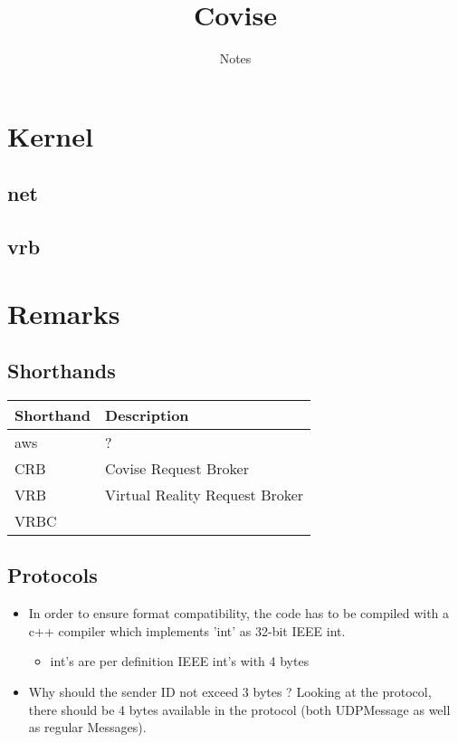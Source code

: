 \documentclass[12pt,pdftex,a4paper]{scrbook}
\newcommand{\shandentry}[2]{\label{intern::shorthands::#1} #1 & #2 \\ \hline}
\begin{document}
	\thispagestyle{empty}
	\title{Covise}
	\subtitle{Notes}
	\author{}
	\maketitle
	
	\newpage
	\tableofcontents

	\part{Kernel}
	
	\chapter{net}
	
	
	
	\chapter{vrb}

	

	\part{Remarks}

	\chapter{Shorthands}
	
	\begin{tabular}{||p{4cm}|p{10cm}||}
		\hline
		\textbf{Shorthand} & \textbf{Description}\\
		\hline
		\hline
		\shandentry{aws}{?}
		\shandentry{CRB}{Covise Request Broker}
		\shandentry{VRB}{Virtual Reality Request Broker}
		\shandentry{VRBC}{}
	\end{tabular}

	

	\chapter{Protocols}

	\begin{itemize}
		\item In order to ensure format compatibility, the code has to be compiled with a c++ compiler which implements 'int' as 32-bit IEEE int.
		\begin{itemize}
			\item int's are per definition IEEE int's with 4 bytes
		\end{itemize}
		\item Why should the sender ID not exceed 3 bytes ? Looking at the protocol, there should be 4 bytes available in the protocol (both UDPMessage as well as regular Messages). 
	\end{itemize}
\end{document}
